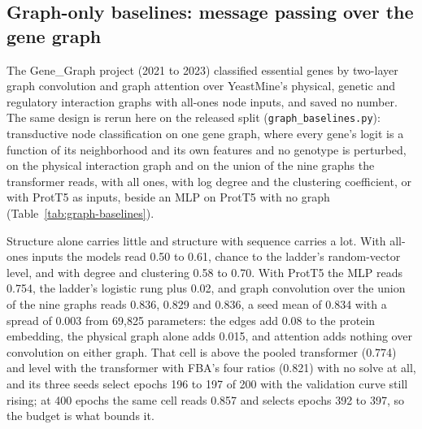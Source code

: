 \subsection{Graph-only baselines: message passing over the gene graph}

The Gene\_Graph project (2021 to 2023) classified essential genes by two-layer graph
convolution and graph attention over YeastMine's physical, genetic and regulatory
interaction graphs with all-ones node inputs, and saved no number. The same design is
rerun here on the released split (\texttt{graph\_baselines.py}): transductive node
classification on one gene graph, where every gene's logit is a function of its
neighborhood and its own features and no genotype is perturbed, on the physical
interaction graph and on the union of the nine graphs the transformer reads, with all
ones, with log degree and the clustering coefficient, or with ProtT5 as inputs, beside
an MLP on ProtT5 with no graph (Table~\ref{tab:graph-baselines}).



Structure alone carries little and structure with sequence carries a lot. With all-ones
inputs the models read 0.50 to 0.61, chance to the ladder's random-vector level, and with
degree and clustering 0.58 to 0.70. With ProtT5 the MLP reads 0.754, the ladder's
logistic rung plus 0.02, and graph convolution over the union of the nine graphs reads
0.836, 0.829 and 0.836, a seed mean of 0.834 with a spread of 0.003 from 69,825
parameters: the edges add 0.08 to the protein embedding, the physical graph alone adds
0.015, and attention adds nothing over convolution on either graph. That cell is above
the pooled transformer (0.774) and level with the transformer with FBA's four ratios
(0.821) with no solve at all, and its three seeds select epochs 196 to 197 of 200 with
the validation curve still rising; at 400 epochs the same cell reads 0.857 and selects
epochs 392 to 397, so the budget is what bounds it.

